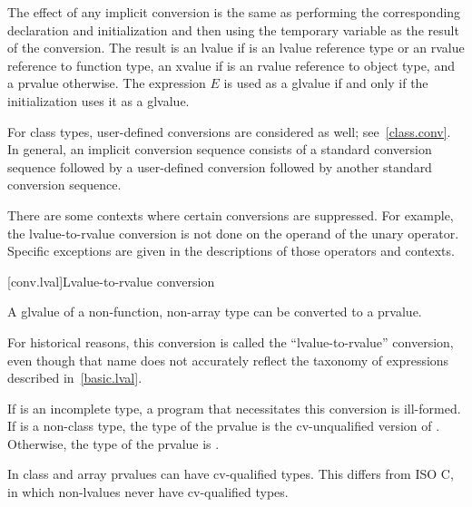 \pnum
The effect of any implicit
conversion is the same as performing the corresponding declaration and initialization
and then using the temporary variable as the result of the conversion.
The result is an lvalue if  is an lvalue reference
type or an rvalue reference to function type,
an xvalue if  is an rvalue reference to object type,
and a prvalue otherwise. The expression $E$
is used as a glvalue if and only if the initialization uses it as a glvalue.

\pnum
\begin{note}
For class types, user-defined conversions are considered as well;
see~\ref{class.conv}. In general, an implicit conversion
sequence consists of a standard conversion
sequence followed by a user-defined conversion followed by another
standard conversion sequence.
\end{note}

\pnum
\begin{note}
There are some contexts where certain conversions are suppressed. For
example, the lvalue-to-rvalue conversion is not done on the operand of
the unary \tcode{\&} operator. Specific exceptions are given in the
descriptions of those operators and contexts.
\end{note}

[conv.lval]{Lvalue-to-rvalue conversion}

\pnum
{}%
%
A glvalue of a non-function, non-array type 
can be converted to
a prvalue.
\begin{footnote}
For historical reasons, this conversion is called the ``lvalue-to-rvalue''
conversion, even though that name does not accurately reflect the taxonomy
of expressions described in~\ref{basic.lval}.
\end{footnote}
If  is an incomplete type, a
program that necessitates this conversion is ill-formed. If 
is a non-class type, the type of the prvalue is
the cv-unqualified version of . Otherwise, the type of the
prvalue is .
\begin{footnote}
In \Cpp{} class and array prvalues can have cv-qualified types.
This differs from ISO C, in which non-lvalues never have
cv-qualified types.
\end{footnote}

